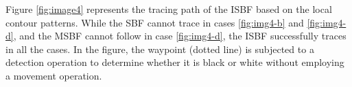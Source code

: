 Figure \ref{fig:image4} represents the tracing path of the ISBF based on the local contour patterns. While the SBF cannot trace in cases \ref{fig:img4-b} and \ref{fig:img4-d}, and the MSBF cannot follow in case \ref{fig:img4-d}, the ISBF successfully traces in all the cases. In the figure, the waypoint (dotted line) is subjected to a detection operation to determine whether it is black or white without employing a movement operation.

\begin{figure}[htbp]
	\centering
	 

\end{figure}
